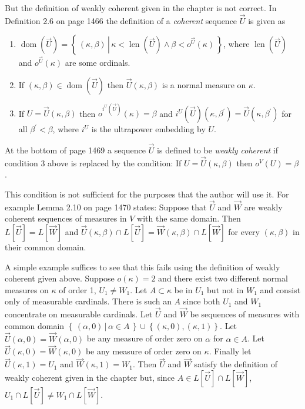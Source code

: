 \documentclass[oneside,12pt]{amsart}
\begin{document}
But the definition of weakly coherent given in the chapter is not correct.
In Definition 2.6 on page 1466 the definition of a \emph{coherent} sequence $\vec{U}$
is given as
\begin{enumerate}
\item $\operatorname{dom}(\vec{U}) =
\left\{ \, (\kappa, \beta) \, \left| \, \kappa < \operatorname{len}(\vec{U}) \wedge \beta < o^{\vec{U}}(\kappa) \, \right.\right\}$,
where $\operatorname{len}(\vec{U})$ and  $o^{\vec{U}}(\kappa)$ are some ordinals.
\item If $(\kappa, \beta) \in \operatorname{dom}(\vec{U})$ then $\vec{U}(\kappa, \beta)$ is a normal measure on $\kappa$.
\item If $U=\vec{U}(\kappa, \beta)$ then $o^{i^{U}(\vec{U})}(\kappa) = \beta$ and $i^{U}(\vec{U})(\kappa, \beta^{\prime})=
\vec{U}(\kappa, \beta^{\prime})$ for all $\beta^{\prime}<\beta$, where $i^{U}$ is the ultrapower embedding by $U$.
\end{enumerate}


At the bottom of page 1469 a sequence $\vec{U}$ is defined to be \emph{weakly coherent}
if condition 3 above is replaced by the condition: If $U=\vec{U}(\kappa, \beta)$  then $o^{V}(U) = \beta$.

This condition is not sufficient for the purposes that the author will use it. For example Lemma 2.10 on
page 1470 states: Suppose that $\vec{U}$ and $\vec{W}$ are weakly coherent sequences of measures in $V$ with
the same domain. Then $L[\vec{U}] = L[\vec{W}]$ and $\vec{U}(\kappa,\beta)\cap L[\vec{U}] =
\vec{W}(\kappa,\beta)\cap L[\vec{W}]$ for every $(\kappa,\beta)$ in their common domain.

A simple example suffices to see that this fails using the definition of weakly coherent given above. Suppose
$o(\kappa) = 2$ and there exist two different normal measures on $\kappa$ of order 1,
$U_1\not=W_1$. Let $A\subset \kappa$ be in $U_1$ but
not in $W_1$ and consist only of measurable cardinals. There is such an $A$ since both $U_1$ and $W_1$ concentrate
on measurable cardinals.
 Let $\vec{U}$ and $\vec{W}$ be sequences of measures with common domain
$\left\{ \, (\alpha, 0) \, \left| \, \alpha \in A \, \right.\right\} \cup \left\{(\kappa, 0), (\kappa, 1)\right\}$.
Let
$\vec{U}(\alpha, 0) = \vec{W}(\alpha, 0)$ be any measure of order zero on $\alpha$ for $\alpha \in A$.
Let $\vec{U}(\kappa, 0) = \vec{W}(\kappa, 0)$ be any measure of order zero on $\kappa$. Finally
let $\vec{U}(\kappa, 1) = U_1$ and $\vec{W}(\kappa, 1) = W_1$. Then $\vec{U}$ and $\vec{W}$ satisfy
the definition of weakly coherent given in the chapter but, since $A\in L[\vec{U}]\cap L[\vec{W}]$,
$U_1\cap L[\vec{U}] \not= W_1\cap L[\vec{W}]$.
\end{document}
